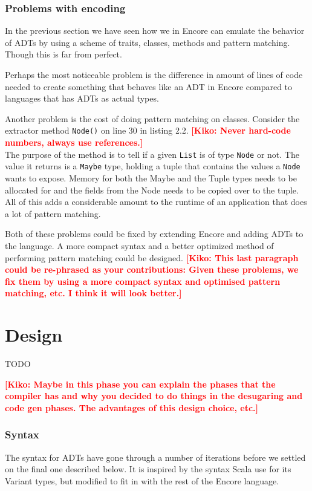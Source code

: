 \documentclass[10pt]{report}
\newcommand{\KIKO}[1]{\textcolor{red}{\textbf{[Kiko: #1]}}}
\begin{document}
\subsection{Problems with encoding}
\par{\noindent In the previous section we have seen how we in Encore can emulate the behavior of ADTs by using a scheme of traits, classes, methods and pattern matching. Though this is far from perfect.\\}
\par{\noindent Perhaps the most noticeable problem is the difference in amount of lines of code needed to create something that behaves like an ADT in Encore compared to languages that has ADTs as actual types.\\}
\par{\noindent Another problem is the cost of doing pattern matching on classes. Consider the extractor method \texttt{Node()} on line 30 in listing 2.2. \KIKO{Never hard-code numbers, always use references.}\\ The purpose of the method is to tell if a given \texttt{List} is of type \texttt{Node} or not. The value it returns is a \texttt{Maybe} type, holding a tuple that contains the values a \texttt{Node} wants to expose. Memory for both the Maybe and the Tuple types needs to be allocated for and the fields from the Node needs to be copied over to the tuple. All of this adds a considerable amount to the runtime of an application that does a lot of pattern matching.\\}
\par{\noindent Both of these problems could be fixed by extending Encore and adding ADTs to the language. A more compact syntax and a better optimized method of performing pattern matching could be designed.}
\KIKO{This last paragraph could be re-phrased as your contributions: Given these problems, we fix them by using a more compact syntax and optimised pattern matching, etc. I think it will look better.}
\chapter{Design}
TODO

\KIKO{Maybe in this phase you can explain the phases that the compiler has and
  why you decided to do things in the desugaring and code gen phases. The advantages
of this design choice, etc.}

\subsection{Syntax}
\par{\noindent The syntax for ADTs have gone through a number of iterations before we settled on the final one described below.  It is inspired by the syntax Scala use for its Variant types, but modified to fit in with the rest of the Encore language.\\}
\end{document}
